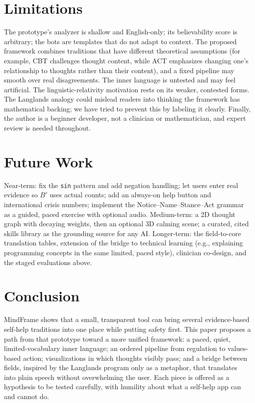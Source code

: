 \documentclass[11pt]{article}
\begin{document}
\section{Limitations}
The prototype's analyzer is shallow and English-only; its believability score is arbitrary; the bots are templates that do not adapt to context. The proposed framework combines traditions that have different theoretical assumptions (for example, CBT challenges thought content, while ACT emphasizes changing one's relationship to thoughts rather than their content), and a fixed pipeline may smooth over real disagreements. The inner language is untested and may feel artificial. The linguistic-relativity motivation rests on its weaker, contested forms. The Langlands analogy could mislead readers into thinking the framework has mathematical backing; we have tried to prevent this by labeling it clearly. Finally, the author is a beginner developer, not a clinician or mathematician, and expert review is needed throughout.

\section{Future Work}
Near-term: fix the \texttt{sin} pattern and add negation handling; let users enter real evidence so $B'$ uses actual counts; add an always-on help button and international crisis numbers; implement the Notice--Name--Stance--Act grammar as a guided, paced exercise with optional audio. Medium-term: a 2D thought graph with decaying weights, then an optional 3D calming scene; a curated, cited skills library as the grounding source for any AI. Longer-term: the field-to-core translation tables, extension of the bridge to technical learning (e.g., explaining programming concepts in the same limited, paced style), clinician co-design, and the staged evaluations above.

\section{Conclusion}
MindFrame shows that a small, transparent tool can bring several evidence-based self-help traditions into one place while putting safety first. This paper proposes a path from that prototype toward a more unified framework: a paced, quiet, limited-vocabulary inner language; an ordered pipeline from regulation to values-based action; visualizations in which thoughts visibly pass; and a bridge between fields, inspired by the Langlands program only as a metaphor, that translates into plain speech without overwhelming the user. Each piece is offered as a hypothesis to be tested carefully, with humility about what a self-help app can and cannot do.
\end{document}
